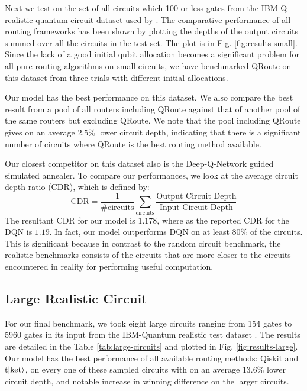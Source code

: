 \documentclass[%
 reprint,
 longbibliography,
 amsmath,amssymb,
 aps,
]{revtex4-2}
\begin{document}
Next we test on the set of all circuits which 100 or less gates from the IBM-Q realistic quantum circuit dataset used by \citet{data_realistic}. The comparative performance of all routing frameworks has been shown by plotting the depths of the output circuits summed over all the circuits in the test set. The plot is in Fig. \ref{fig:results-small}. Since the lack of a good initial qubit allocation becomes a significant problem for all pure routing algorithms on small circuits, we have benchmarked QRoute on this dataset from three trials with different initial allocations.

Our model has the best performance on this dataset. We also compare the best result from a pool of all routers including QRoute against that of another pool of the same routers but excluding QRoute. We note that the pool including QRoute gives on an average $2.5\%$ lower circuit depth, indicating that there is a significant number of circuits where QRoute is the best routing method available.

Our closest competitor on this dataset also is the Deep-Q-Network guided simulated annealer. To compare our performances, we look at the average circuit depth ratio (CDR), which is defined by:
\begin{equation}
    \text{CDR} = \frac{1}{\textrm{\#circuits}} \sum_{\textrm{circuits}} \frac{\textrm{Output Circuit Depth}}{\textrm{Input Circuit Depth}}
    \label{eq:CDR}
\end{equation}
The resultant CDR for our model is $1.178$, where as the reported CDR for the DQN is $1.19$. In fact, our model outperforms DQN on at least $80\%$ of the circuits. This is significant because in contrast to the random circuit benchmark, the realistic benchmarks consists of the circuits that are more closer to the circuits encountered in reality for performing useful computation.

\subsection{\label{sec:results-realistic}Large Realistic Circuit}

For our final benchmark, we took eight large circuits ranging from 154 gates to 5960 gates in its input from the IBM-Quantum realistic test dataset \citep{data_realistic}. The results are detailed in the Table \ref{tab:large-circuits} and plotted in Fig. \ref{fig:results-large}. Our model has the best performance of all available routing methods: Qiskit and t$\ket{\text{ket}}$, on every one of these sampled circuits with on an average $13.6\%$ lower circuit depth, and notable increase in winning difference on the larger circuits.
\end{document}
